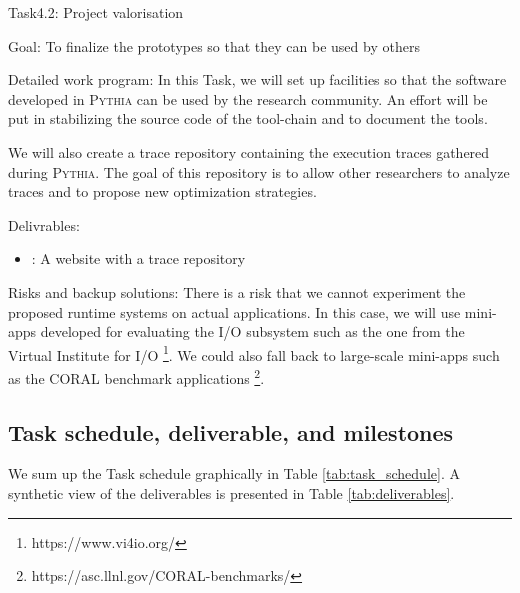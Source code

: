 \documentclass[a4paper,11pt,defblank]{article}
\newcommand{\pname}{\textsc{Pythia}\xspace}
\begin{document}
\begin{paragraph}{Task4.2: Project valorisation}

  \begin{paragraph}{Goal:}
    To finalize the prototypes so that they can be used by others
  \end{paragraph}

  \begin{paragraph}{Detailed work program:}
  In this Task, we will set up facilities so that the software
  developed in \pname can be used by the research community. An effort
  will be put in stabilizing the source code of the tool-chain and
  to document the tools.

  We will also create a trace repository containing the execution
  traces gathered during \pname. The goal of this repository is to
  allow other researchers to analyze traces and to propose new
  optimization strategies.
  \end{paragraph}
  \begin{paragraph}{Delivrables:}
  \begin{itemize}
  \item[T0+36] [D4.2]: A website with a trace repository
  \end{itemize}
  \end{paragraph}

  \begin{paragraph}{Risks and backup solutions:}
There is a risk that we cannot experiment the proposed runtime systems
on actual applications. In this case, we will use mini-apps developed
for evaluating the I/O subsystem such as the one from the Virtual
Institute for I/O \footnote{https://www.vi4io.org/}. We could also
fall back to large-scale mini-apps such as the CORAL benchmark
applications \footnote{https://asc.llnl.gov/CORAL-benchmarks/}.
  \end{paragraph}

\end{paragraph}





\subsection{Task schedule, deliverable, and milestones}
We sum up the Task schedule graphically in Table
\ref{tab:task_schedule}. A synthetic view of the deliverables is
presented in Table \ref{tab:deliverables}.

\end{document}
